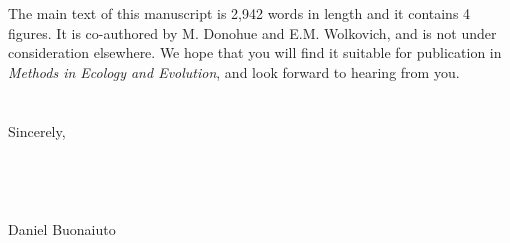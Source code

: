 \documentclass[11.5 pt]{article}
\begin{document}
\noindent The main text of this manuscript is 2,942 words in length and it contains 4 figures. It is co-authored by M. Donohue and E.M. Wolkovich, and is not under consideration elsewhere. We hope that you will find it suitable for publication in \textit{Methods in Ecology and Evolution}, and look forward to hearing from you.\\\\ 
\\Sincerely,\\\\\\\\\\

\noindent Daniel Buonaiuto\\


\end{document}
